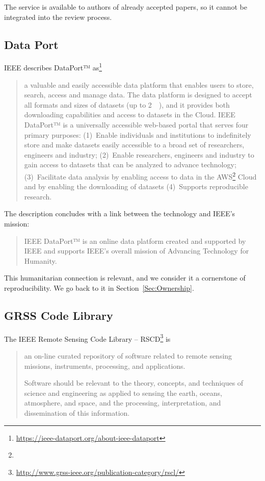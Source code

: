 \documentclass[journal,twoside]{IEEEtran}
\providecommand{\DIFadd}[1]{{\protect\color{blue}\uwave{#1}}} %
\providecommand{\DIFaddbegin}{} %
\providecommand{\DIFaddend}{} %
\newcommand{\DIFaddincludegraphics}[2][]{{\color{blue}\fbox{\DIFOincludegraphics[#1]{#2}}}} %
\DeclareRobustCommand{\DIFaddbegin}{\DIFOaddbegin \let\includegraphics\DIFaddincludegraphics} %
\DeclareRobustCommand{\DIFaddend}{\DIFOaddend \let\includegraphics\DIFOincludegraphics} %
\begin{document}
The service is available to authors of already accepted papers, so it cannot be integrated into the review process.

\subsection{Data Port}

IEEE describes DataPort™ as\footnote{\url{https://ieee-dataport.org/about-ieee-dataport}} 
\begin{quote}
	a valuable and easily accessible data platform that enables users to store, search, access and manage data.  
	The data platform is designed to accept all formats and sizes of datasets (up to \SI{2}{\tera\byte}), and it provides both downloading capabilities and access to datasets in the Cloud.  
	IEEE DataPort™ is a universally accessible web-based portal that serves four primary purposes: 
	(1)~Enable individuals and institutions to indefinitely store and make datasets easily accessible to a broad set of researchers, engineers and industry;  
	(2)~Enable researchers, engineers and industry to gain access to datasets that can be analyzed to advance technology;
	(3)~Facilitate data analysis by enabling access to data in the AWS\DIFaddbegin \footnote{\DIFadd{Amazon Web Services}} \DIFaddend Cloud and by enabling the downloading of datasets
	(4)~Supports reproducible research.
\end{quote}

The description concludes with a link between the technology and IEEE's mission:
\begin{quote}
	IEEE DataPort™ is an online data platform created and supported by IEEE and supports IEEE’s overall mission of Advancing Technology for Humanity.  
\end{quote}
This humanitarian connection is relevant, and we consider it a cornerstone of reproducibility.
We go back to it in Section~\ref{Sec:Ownership}.


\subsection{GRSS Code Library}

The IEEE Remote Sensing Code Library -- RSCD\footnote{\url{http://www.grss-ieee.org/publication-category/rscl/}} is 
\begin{quote}
	an on-line curated repository of software related to remote sensing missions, instruments, processing, and applications.

	Software should be relevant to the theory, concepts, and techniques of science and engineering as applied to sensing the earth, oceans, atmosphere, and space, and the processing, interpretation, and dissemination of this information.
\end{quote}
\end{document}
